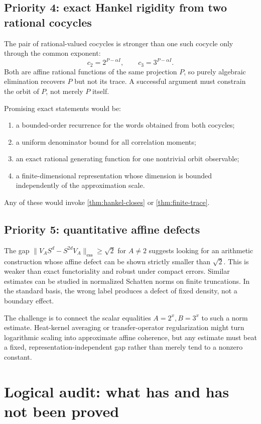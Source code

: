 \documentclass[11pt,oneside]{article}
\theoremstyle{definition}
\theoremstyle{remark}
\newcommand{\ess}{\mathrm{ess}}
\begin{document}
\subsection{Priority 4: exact Hankel rigidity from two rational cocycles}

The pair of rational-valued cocycles is stronger than one such cocycle
only through the common exponent:
\[
        c_2=2^{P-\alpha I},\qquad
        c_3=3^{P-\alpha I}.
\]
Both are affine rational functions of the same projection \(P\), so
purely algebraic elimination recovers \(P\) but not its trace.  A
successful argument must constrain the orbit of \(P\), not merely \(P\)
itself.

Promising exact statements would be:
\begin{enumerate}
\item a bounded-order recurrence for the words obtained from both
      cocycles;
\item a uniform denominator bound for all correlation moments;
\item an exact rational generating function for one nontrivial orbit
      observable;
\item a finite-dimensional representation whose dimension is bounded
      independently of the approximation scale.
\end{enumerate}
Any of these would invoke \cref{thm:hankel-closes} or
\cref{thm:finite-trace}.

\subsection{Priority 5: quantitative affine defects}

The gap
\(\|V_AS^d-S^{2d}V_A\|_{\ess}\geq\sqrt2\) for \(A\neq2\) suggests
looking for an arithmetic construction whose affine defect can be shown
strictly smaller than \(\sqrt2\).  This is weaker than exact
functoriality and robust under compact errors.  Similar estimates can be
studied in normalized Schatten norms on finite truncations.  In the
standard basis, the wrong label produces a defect of fixed density, not
a boundary effect.

The challenge is to connect the scalar equalities \(A=2^x,B=3^x\) to
such a norm estimate.  Heat-kernel averaging or transfer-operator
regularization might turn logarithmic scaling into approximate affine
coherence, but any estimate must beat a fixed, representation-independent
gap rather than merely tend to a nonzero constant.

\section{Logical audit: what has and has not been proved}
\end{document}
